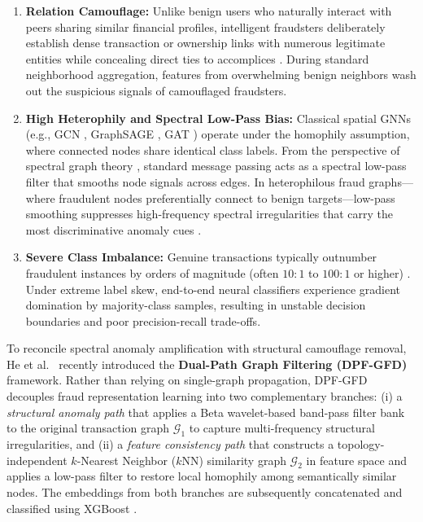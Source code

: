 \documentclass[10pt,a4paper,twocolumn]{article}
\begin{document}
\begin{enumerate}
  \item \textbf{Relation Camouflage:} Unlike benign users who naturally interact with peers sharing similar financial profiles, intelligent fraudsters deliberately establish dense transaction or ownership links with numerous legitimate entities while concealing direct ties to accomplices \cite{ref8,ref36}. During standard neighborhood aggregation, features from overwhelming benign neighbors wash out the suspicious signals of camouflaged fraudsters.
  \item \textbf{High Heterophily and Spectral Low-Pass Bias:} Classical spatial GNNs (e.g., GCN \cite{ref45}, GraphSAGE \cite{ref46}, GAT \cite{ref47}) operate under the homophily assumption, where connected nodes share identical class labels. From the perspective of spectral graph theory \cite{ref13,ref33}, standard message passing acts as a spectral low-pass filter that smooths node signals across edges. In heterophilous fraud graphs---where fraudulent nodes preferentially connect to benign targets---low-pass smoothing suppresses high-frequency spectral irregularities that carry the most discriminative anomaly cues \cite{ref32,ref50}.
  \item \textbf{Severe Class Imbalance:} Genuine transactions typically outnumber fraudulent instances by orders of magnitude (often $10:1$ to $100:1$ or higher) \cite{ref38,ref44}. Under extreme label skew, end-to-end neural classifiers experience gradient domination by majority-class samples, resulting in unstable decision boundaries and poor precision-recall trade-offs.
\end{enumerate}

To reconcile spectral anomaly amplification with structural camouflage removal, He et al.\ \cite{ref9} recently introduced the \textbf{Dual-Path Graph Filtering (DPF-GFD)} framework. Rather than relying on single-graph propagation, DPF-GFD decouples fraud representation learning into two complementary branches: (i) a \textit{structural anomaly path} that applies a Beta wavelet-based band-pass filter bank \cite{ref32} to the original transaction graph $\mathscr{G}_1$ to capture multi-frequency structural irregularities, and (ii) a \textit{feature consistency path} that constructs a topology-independent $k$-Nearest Neighbor ($k$NN) similarity graph $\mathscr{G}_2$ in feature space and applies a low-pass filter to restore local homophily among semantically similar nodes. The embeddings from both branches are subsequently concatenated and classified using XGBoost \cite{ref39}.
\end{document}
